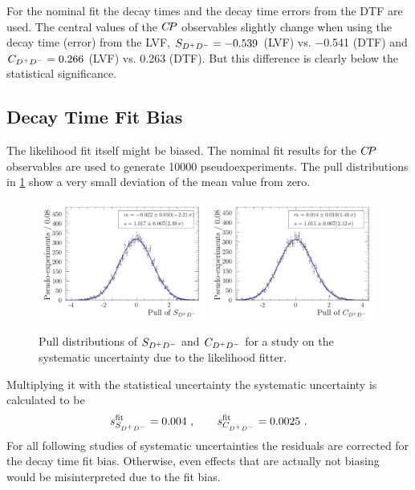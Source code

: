 For the nominal fit the decay times and the decay time errors from the DTF are
used. The central values of the ${C\!P}$ observables slightly change when using
the decay time (error) from the LVF, $S_{{{D}^+}{{D}^-}} = \num{-0.539}$ (LVF) vs.
\num{-0.541} (DTF) and $C_{{{D}^+}{{D}^-}} = \num{0.266}$ (LVF) vs. \num{0.263} (DTF). But
this difference is clearly below the statistical significance.

\FloatBarrier

\subsection{Decay Time Fit Bias}
\label{sec:b02dd:systematics:fitbias}

The likelihood fit itself might be biased. The nominal fit results for the
${C\!P}$ observables are used to generate \num{10000} pseudoexperiments. The pull
distributions in \cref{fig:b02dd:systematics:fitbias:pulls} show a very small
deviation of the mean value from zero.
%
\begin{figure}[htb]
\includegraphics[width=0.49\textwidth]{07-B02DD/tikz/pdf/parSigTimeSin2b_pull_fitbias.pdf}
\includegraphics[width=0.49\textwidth]{07-B02DD/tikz/pdf/parSigTimeC_pull_fitbias.pdf}
\caption{Pull distributions of $S_{{{D}^+}{{D}^-}}$ and $C_{{{D}^+}{{D}^-}}$ for a study on the systematic
uncertainty due to the likelihood fitter.}
\label{fig:b02dd:systematics:fitbias:pulls}
\end{figure}
%
Multiplying it with the statistical uncertainty the systematic uncertainty is
calculated to be
\begin{align}
s_{S_{{{D}^+}{{D}^-}}}^{\textrm{fit}} = \num{0.004}\ , \qquad s_{C_{{{D}^+}{{D}^-}}}^{\textrm{fit}} = \num{0.0025}\ .
\end{align}
For all following studies of systematic uncertainties the residuals are
corrected for the decay time fit bias. Otherwise, even effects that are
actually not biasing would be misinterpreted due to the fit bias.


